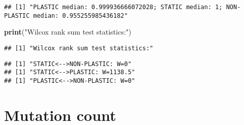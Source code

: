 \documentclass[]{book}
\newenvironment{Shaded}{\begin{snugshade}}{\end{snugshade}}
\newcommand{\ControlFlowTok}[1]{\textcolor[rgb]{0.13,0.29,0.53}{\textbf{#1}}}
\newcommand{\DataTypeTok}[1]{\textcolor[rgb]{0.13,0.29,0.53}{#1}}
\newcommand{\DecValTok}[1]{\textcolor[rgb]{0.00,0.00,0.81}{#1}}
\newcommand{\KeywordTok}[1]{\textcolor[rgb]{0.13,0.29,0.53}{\textbf{#1}}}
\newcommand{\NormalTok}[1]{#1}
\newcommand{\OperatorTok}[1]{\textcolor[rgb]{0.81,0.36,0.00}{\textbf{#1}}}
\newcommand{\OtherTok}[1]{\textcolor[rgb]{0.56,0.35,0.01}{#1}}
\newcommand{\StringTok}[1]{\textcolor[rgb]{0.31,0.60,0.02}{#1}}
\begin{document}
\begin{verbatim}
## [1] "PLASTIC median: 0.999936666072028; STATIC median: 1; NON-PLASTIC median: 0.955255985436182"
\end{verbatim}

\begin{Shaded}
\begin{Highlighting}[]
\KeywordTok{print}\NormalTok{(}\StringTok{"Wilcox rank sum test statistics:"}\NormalTok{)}
\end{Highlighting}
\end{Shaded}

\begin{verbatim}
## [1] "Wilcox rank sum test statistics:"
\end{verbatim}

\begin{Shaded}
\end{Shaded}

\begin{verbatim}
## [1] "STATIC<-->NON-PLASTIC: W=0"
## [1] "STATIC<-->PLASTIC: W=1138.5"
## [1] "PLASTIC<-->NON-PLASTIC: W=0"
\end{verbatim}

\hypertarget{mutation-count}{%
\section{Mutation count}\label{mutation-count}}
\end{document}
